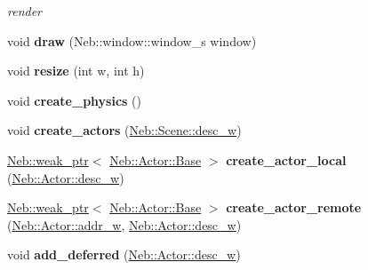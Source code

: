 \begin{DoxyCompactItemize}
\begin{DoxyCompactList}\small\item\em render \end{DoxyCompactList}\item 
\hypertarget{classNeb_1_1Scene_1_1scene_a0499b9871487c91029c418d40e79eddb}{void {\bfseries draw} (\-Neb\-::window\-::window\-\_\-s window)}\label{classNeb_1_1Scene_1_1scene_a0499b9871487c91029c418d40e79eddb}

\item 
\hypertarget{classNeb_1_1Scene_1_1scene_af45ff91be738e42fb4c717d26482feb0}{void {\bfseries resize} (int w, int h)}\label{classNeb_1_1Scene_1_1scene_af45ff91be738e42fb4c717d26482feb0}

\item 
\hypertarget{classNeb_1_1Scene_1_1scene_a8212512abd9a873de8e31a81d8b01ea9}{void {\bfseries create\-\_\-physics} ()}\label{classNeb_1_1Scene_1_1scene_a8212512abd9a873de8e31a81d8b01ea9}

\item 
\hypertarget{classNeb_1_1Scene_1_1scene_a45bdec98ff1510610a384b23ddb4f5ee}{void {\bfseries create\-\_\-actors} (\hyperlink{classNeb_1_1weak__ptr}{\-Neb\-::\-Scene\-::desc\-\_\-w})}\label{classNeb_1_1Scene_1_1scene_a45bdec98ff1510610a384b23ddb4f5ee}

\item 
\hypertarget{classNeb_1_1Scene_1_1scene_ab8d68d80d7c845309f4963ba05e51c53}{\hyperlink{classNeb_1_1weak__ptr}{\-Neb\-::weak\-\_\-ptr}$<$ \hyperlink{classNeb_1_1Actor_1_1Base}{\-Neb\-::\-Actor\-::\-Base} $>$ {\bfseries create\-\_\-actor\-\_\-local} (\hyperlink{classNeb_1_1weak__ptr}{\-Neb\-::\-Actor\-::desc\-\_\-w})}\label{classNeb_1_1Scene_1_1scene_ab8d68d80d7c845309f4963ba05e51c53}

\item 
\hypertarget{classNeb_1_1Scene_1_1scene_a480cf2b9eea6e92a87833c1016574951}{\hyperlink{classNeb_1_1weak__ptr}{\-Neb\-::weak\-\_\-ptr}$<$ \hyperlink{classNeb_1_1Actor_1_1Base}{\-Neb\-::\-Actor\-::\-Base} $>$ {\bfseries create\-\_\-actor\-\_\-remote} (\hyperlink{classNeb_1_1weak__ptr}{\-Neb\-::\-Actor\-::addr\-\_\-w}, \hyperlink{classNeb_1_1weak__ptr}{\-Neb\-::\-Actor\-::desc\-\_\-w})}\label{classNeb_1_1Scene_1_1scene_a480cf2b9eea6e92a87833c1016574951}

\item 
\hypertarget{classNeb_1_1Scene_1_1scene_a8bbe83d2c4cede51faf7b8044e27f425}{void {\bfseries add\-\_\-deferred} (\hyperlink{classNeb_1_1weak__ptr}{\-Neb\-::\-Actor\-::desc\-\_\-w})}\label{classNeb_1_1Scene_1_1scene_a8bbe83d2c4cede51faf7b8044e27f425}


\end{DoxyCompactItemize}
